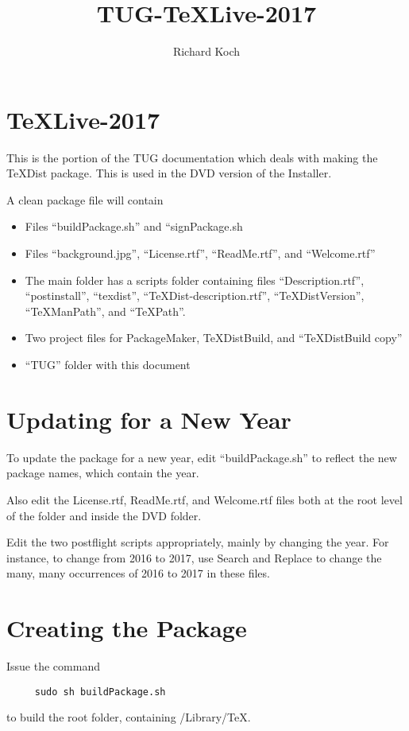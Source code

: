 \documentclass[11pt, oneside]{amsart}
\title{TUG-TeXLive-2017}
\author{Richard Koch}
\begin{document}
\maketitle
\section{TeXLive-2017}
This is the portion of the TUG documentation which deals with making the TeXDist package.
This is used in the DVD version of the Installer.

A clean package file will contain
\begin{itemize}
\item Files ``buildPackage.sh'' and ``signPackage.sh
\item Files  ``background.jpg'', ``License.rtf'', ``ReadMe.rtf'', and ``Welcome.rtf''
\item The main folder  has a scripts folder containing  files ``Description.rtf'', ``postinstall'', 
 ``texdist'', ``TeXDist-description.rtf'', ``TeXDistVersion'', ``TeXManPath'', and ``TeXPath''. 
\item Two project files for PackageMaker, TeXDistBuild, and ``TeXDistBuild copy''
\item ``TUG'' folder with this document
\end{itemize}

\section{Updating for a New Year}

To update the  package for a new year, edit ``buildPackage.sh'' to
reflect the new package names, which contain the year.  

Also edit the License.rtf, ReadMe.rtf, and Welcome.rtf files both at the root level of the folder and inside the DVD folder.
 
Edit the two postflight scripts appropriately, mainly by changing the year.
For instance, to change from 2016 to 2017, use Search and Replace to change the many,
many occurrences of 2016 to 2017 in these files.

\section{Creating the  Package}

Issue the command

\begin{verbatim}
     sudo sh buildPackage.sh
 \end{verbatim}
to build the root folder, containing /Library/TeX.
\end{document}
